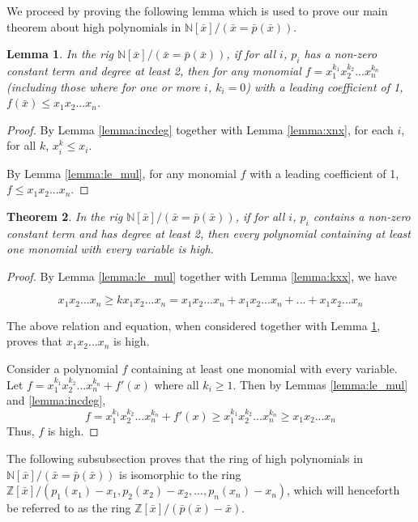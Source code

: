 \documentclass{msthesis}
\newtheorem{theorem}{Theorem}[section]
\newtheorem{lemma}[theorem]{Lemma}
\theoremstyle{definition}
\newcommand{\ints}{\mathbb{Z}}
\newcommand{\nat}{\mathbb{N}}
\begin{document}
We proceed by proving the following lemma which is used to prove our main theorem about high polynomials in $\nat[\bar{x}]/(\bar{x}=\bar{p}(\bar{x}))$.

\begin{lemma}\label{lemma:mvmono}
    In the rig $\nat[\bar{x}]/(\bar{x}=\bar{p}(\bar{x}))$, if for all $i$, $p_i$ has a non-zero constant term and degree at least 2, then for any monomial $f = x_1^{k_1}x_2^{k_2}...x_n^{k_n}$ (including those where for one or more $i$, $k_i = 0$) with a leading coefficient of 1, $f(\bar{x}) \le x_1x_2...x_n$.
\end{lemma}

\begin{proof}
    By Lemma \ref{lemma:incdeg} together with Lemma \ref{lemma:xnx}, for each $i$, for all $k$, $x_i^k \le x_i$.

    By Lemma \ref{lemma:le_mul}, for any monomial $f$ with a leading coefficient of 1, $f \le x_1x_2...x_n$.
\end{proof}

\begin{theorem}
    In the rig $\nat[\bar{x}]/(\bar{x}=\bar{p}(\bar{x}))$, if for all $i$, $p_i$ contains a non-zero constant term and has degree at least 2, then every polynomial containing at least one monomial with every variable is high.
\end{theorem}

\begin{proof}
    By Lemma \ref{lemma:le_mul} together with Lemma \ref{lemma:kxx}, we have

    \[ x_1x_2...x_n \ge kx_1x_2...x_n = x_1x_2...x_n + x_1x_2...x_n + ... + x_1x_2...x_n \]

    The above relation and equation, when considered together with Lemma \ref{lemma:mvmono}, proves that $x_1x_2...x_n$ is high.

    Consider a polynomial $f$ containing at least one monomial with every variable.  Let $f = x_1^{k_1}x_2^{k_2}...x_n^{k_n} + f'(x)$ where all $k_i \ge 1$. Then by Lemmas \ref{lemma:le_mul} and \ref{lemma:incdeg}, 
    \[ f = x_1^{k_1}x_2^{k_2}...x_n^{k_n} + f'(x) \ge x_1^{k_1}x_2^{k_2}...x_n^{k_n} \ge x_1x_2...x_n \]
    \noindent
    Thus, $f$ is high.
\end{proof}

The following subsubsection proves that the ring of high polynomials in $\nat[\bar{x}]/(\bar{x}=\bar{p}(\bar{x}))$ is isomorphic to the ring $\ints[\bar{x}]/(p_1(x_1)-x_1, p_2(x_2)-x_2, ..., p_n(x_n)-x_n)$, which will henceforth be referred to as the ring $\ints[\bar{x}]/(\bar{p}(\bar{x})-\bar{x})$.
\end{document}
